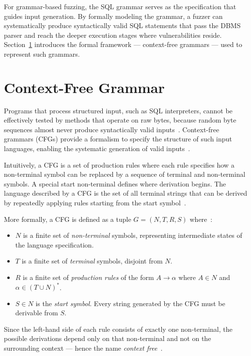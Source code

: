 For grammar-based fuzzing, the SQL grammar serves as the specification that guides input generation. By formally modeling the grammar, a fuzzer can systematically produce syntactically valid SQL statements that pass the DBMS parser and reach the deeper execution stages where vulnerabilities reside. Section~\ref{sec:bg-cfg} introduces the formal framework --- context-free grammars --- used to represent such grammars.


\section{Context-Free Grammar}
\label{sec:bg-cfg}

Programs that process structured input, such as SQL interpreters, cannot be effectively tested by methods that operate on raw bytes, because random byte sequences almost never produce syntactically valid inputs~\citep{nautilus}. Context-free grammars (CFGs) provide a formalism to specify the structure of such input languages, enabling the systematic generation of valid inputs~\citep{hopcroft}.

Intuitively, a CFG is a set of production rules where each rule specifies how a non-terminal symbol can be replaced by a sequence of terminal and non-terminal symbols. A special start non-terminal defines where derivation begins. The language described by a CFG is the set of all terminal strings that can be derived by repeatedly applying rules starting from the start symbol~\citep{hopcroft}.

More formally, a CFG is defined as a tuple $G = (N, T, R, S)$ where~\citep{hopcroft}:

\begin{itemize}
    \item $N$ is a finite set of \textit{non-terminal} symbols, representing intermediate states of the language specification.
    \item $T$ is a finite set of \textit{terminal} symbols, disjoint from $N$.
    \item $R$ is a finite set of \textit{production rules} of the form $A \to \alpha$ where $A \in N$ and $\alpha \in (T \cup N)^*$.
    \item $S \in N$ is the \textit{start symbol}. Every string generated by the CFG must be derivable from $S$.
\end{itemize}

Since the left-hand side of each rule consists of exactly one non-terminal, the possible derivations depend only on that non-terminal and not on the surrounding context --- hence the name \textit{context free}~\citep{hopcroft}.

